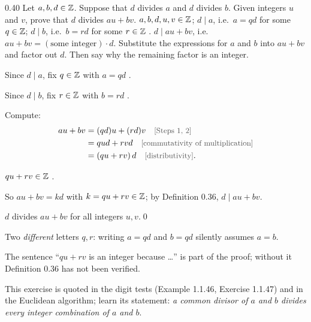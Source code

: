 \begin{bookex}[essential]{0.40}
Let $a,b,d\in\mathbb{Z}$. Suppose that $d$ divides $a$ and $d$ divides $b$. Given integers $u$ and $v$, prove that $d$ divides $au+bv$.
\solution
\given $a,b,d,u,v\in\mathbb{Z}$; $d\mid a$, i.e.\ $a=qd$ for some $q\in\mathbb{Z}$; $d\mid b$, i.e.\ $b=rd$ for some $r\in\mathbb{Z}$ .
\goal $d\mid au+bv$, i.e.\ $au+bv=(\text{some integer})\cdot d$.
\plan Substitute the expressions for $a$ and $b$ into $au+bv$ and factor out $d$. Then say why the remaining factor is an integer.
\begin{steps}
\item Since $d\mid a$, fix $q\in\mathbb{Z}$ with $a=qd$ .
\item Since $d\mid b$, fix $r\in\mathbb{Z}$ with $b=rd$ .
\item Compute:
\begin{align*}
au+bv&=(qd)u+(rd)v \why{Steps 1, 2}\\
&=qud+rvd \why{commutativity of multiplication}\\
&=(qu+rv)\,d \why{distributivity}.
\end{align*}
\item $qu+rv\in\mathbb{Z}$ .
\item So $au+bv=kd$ with $k=qu+rv\in\mathbb{Z}$; by Definition 0.36, $d\mid au+bv$.
\end{steps}
\conclusion $d$ divides $au+bv$ for all integers $u,v$.\qed
\begin{compare}
\item Two \emph{different} letters $q,r$: writing $a=qd$ and $b=qd$ silently assumes $a=b$.
\item The sentence ``$qu+rv$ is an integer because \dots'' is part of the proof; without it Definition 0.36 has not been verified.
\item This exercise is quoted in the digit tests (Example 1.1.46, Exercise 1.1.47) and in the Euclidean algorithm; learn its statement: \emph{a common divisor of $a$ and $b$ divides every integer combination of $a$ and $b$}.
\end{compare}
\end{bookex}

